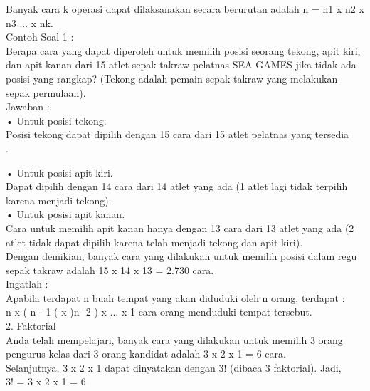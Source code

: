 \documentclass[11pt,fleqn]{book} %
\begin{document}
Banyak cara k operasi dapat dilaksanakan secara berurutan adalah n = n1 x n2 x n3 ... x nk.\\

Contoh Soal 1 :\\

Berapa cara yang dapat diperoleh untuk memilih posisi seorang tekong, apit kiri, dan apit kanan dari 15 atlet sepak takraw pelatnas SEA GAMES jika tidak ada posisi yang rangkap? (Tekong adalah pemain sepak takraw yang melakukan sepak permulaan).\\

Jawaban :\\

• Untuk posisi tekong.\\
Posisi tekong dapat dipilih dengan 15 cara dari 15 atlet pelatnas yang tersedia\\.

• Untuk posisi apit kiri.\\
Dapat dipilih dengan 14 cara dari 14 atlet yang ada (1 atlet lagi tidak terpilih karena menjadi tekong).\\

• Untuk posisi apit kanan.\\
Cara untuk memilih apit kanan hanya dengan 13 cara dari 13 atlet yang ada (2 atlet tidak dapat dipilih karena telah menjadi tekong dan apit kiri).\\

Dengan demikian, banyak cara yang dilakukan untuk memilih posisi dalam regu sepak takraw adalah  15 x 14 x 13 = 2.730 cara.\\

Ingatlah :\\

Apabila terdapat n buah tempat yang akan diduduki oleh n orang, terdapat :\\

n x ( n - 1 ( x )n -2 ) x ... x 1 cara orang menduduki tempat tersebut.\\

2. Faktorial\\

Anda telah mempelajari, banyak cara yang dilakukan untuk memilih 3 orang pengurus kelas dari 3 orang kandidat adalah 3 x 2 x 1 = 6 cara.\\

Selanjutnya, 3 x 2 x 1 dapat dinyatakan dengan 3! (dibaca 3 faktorial). Jadi,\\

3! = 3 x 2 x 1 = 6\\
\end{document}
